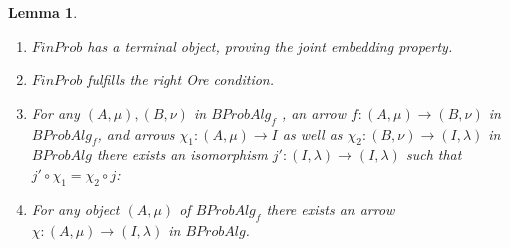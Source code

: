 \documentclass[a4paper,draft]{amsproc}
\theoremstyle{plain}
\newtheorem{lemma}{Lemma}[section]
\theoremstyle{definition}
\theoremstyle{remark}
\numberwithin{equation}{section}
\begin{document}
\begin{lemma}\begin{enumerate}
\item $FinProb$ has a terminal object, proving the joint embedding property.
\item $FinProb$ fulfills the right Ore condition.
\item For any $(A,\mu),(B,\nu)$ in $BProbAlg_f$ , an arrow $f:(A,\mu)\rightarrow (B,\nu)$ in \\
 $BProbAlg_f$, and arrows $\chi_1:(A,\mu)\rightarrow I$ as well as $\chi_2:(B,\nu)\rightarrow (I,\lambda)$ in $BProbAlg$ there exists an isomorphism $j':(I,\lambda)\rightarrow (I,\lambda)$ such that $j'\circ \chi_1=\chi_2\circ j$:
 \begin{center}
 \end{center}
\item For any object $(A,\mu)$ of $BProbAlg_f$ there exists an arrow $\chi:(A,\mu)\rightarrow (I,\lambda)$ in $BProbAlg$.
\end{enumerate}
\end{lemma}
\end{document}
